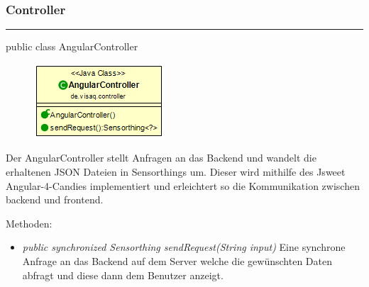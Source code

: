 \subsubsection{Controller}

\rule{\textwidth}{0.4pt}
public class AngularController

\begin{minipage}{0.4\textwidth}
    \begin{figure}[H]
        {\centering\includegraphics[scale = 0.7]{media/frontend/controller/AngularController_Class.png}}
    \end{figure}
    \end{minipage} \hfill
    \begin{minipage}{0.6\textwidth}
Der AngularController stellt Anfragen an das Backend und wandelt die erhaltenen JSON Dateien in Sensorthings um. Dieser wird mithilfe des \gls{Jsweet} \gls{Angular-4-Candies} implementiert und erleichtert so die Kommunikation zwischen backend und frontend.
\end{minipage}
Methoden: \begin{itemize}
    \item \emph{public synchronized Sensorthing sendRequest(String input)} Eine synchrone Anfrage an das Backend auf dem Server welche die gewünschten Daten abfragt und diese dann dem Benutzer anzeigt.
\end{itemize}